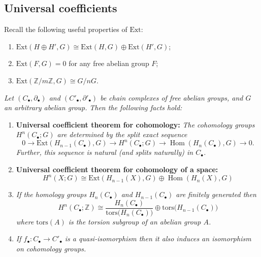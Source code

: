 \documentclass[10pt]{article}
\newcommand{\zz}{\mathbb{Z}}
\newcommand{\Ext}{\mathrm{Ext}}
\DeclareMathOperator{\Hom}{Hom}
\begin{document}
        \subsection{Universal coefficients}

            Recall the following useful properties of $\Ext$:
            \begin{enumerate}
                \item $\Ext(H\oplus H',G)\cong\Ext(H,G)\oplus\Ext(H',G)$;
                \item $\Ext(F,G)=0$ for any free abelian group $F$;
                \item $\Ext(\zz/m\zz,G)\cong G/nG$.
            \end{enumerate}

            \medskip

            \emph{Let $(C_\bullet,\partial_\bullet)$  and $(C'_\bullet,\partial'_\bullet)$ be chain complexes of \emph{free abelian} groups, and $G$ an arbitrary \emph{abelian} group.}
            \emph{Then the following facts hold:}
            \begin{enumerate}
                \item \textbf{Universal coefficient theorem for cohomology:}
                    \emph{The cohomology groups $H^n(C_\bullet;G)$ are determined by the \emph{split} exact sequence}
                    \begin{equation*}
                        0\to\Ext(H_{n-1}(C_\bullet),G)\to H^n(C_\bullet;G)\to \Hom(H_n(C_\bullet),G)\to0.
                    \end{equation*}
                    \emph{Further, this sequence is natural (and splits naturally) in $C_\bullet$.}
                \item \textbf{Universal coefficient theorem for cohomology of a space:} $$H^n(X;G)\cong\Ext(H_{n-1}(X),G)\oplus\Hom(H_n(X),G)$$
                \item \emph{If the homology groups $H_n(C_\bullet)$ and $H_{n-1}(C_\bullet)$ are finitely generated then}
                    \begin{equation*}
                        H^n(C_\bullet;\zz)\cong\frac{H_n(C_\bullet)}{\mathrm{tors}\big(H_n(C_\bullet)\big)}\oplus\mathrm{tors}\big(H_{n-1}(C_\bullet)\big)
                    \end{equation*}
                    \emph{where $\mathrm{tors}(A)$ is the torsion subgroup of an abelian group $A$.}
                \item \emph{If $f_\bullet\colon C_\bullet\to C'_\bullet$ is a quasi-isomorphism then it also induces an isomorphism on cohomology groups.}
            \end{enumerate}
\end{document}
